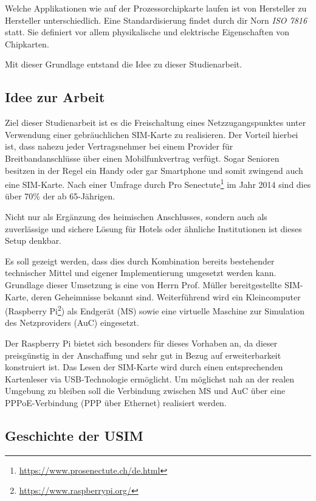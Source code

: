 Welche Applikationen wie auf der Prozessorchipkarte laufen ist von Hersteller zu Hersteller unterschiedlich.
Eine Standardisierung findet durch dir Norn \textit{ISO 7816} statt. Sie definiert vor allem physikalische
und elektrische Eigenschaften von Chipkarten.

Mit dieser Grundlage entstand die Idee zu dieser Studienarbeit.

\subsection{Idee zur Arbeit}
\label{idee-arbeit}
Ziel dieser Studienarbeit ist es die Freischaltung eines Netzzugangspunktes unter Verwendung einer 
gebräuchlichen \ac{SIM}-Karte zu realisieren. Der Vorteil hierbei ist, dass nahezu jeder
Vertragsnehmer bei einem Provider für Breitbandanschlüsse über einen Mobilfunkvertrag verfügt.
Sogar Senioren besitzen in der Regel ein Handy oder gar Smartphone und somit zwingend auch eine
\ac{SIM}-Karte. Nach einer Umfrage durch Pro Senectute\footnote{\url{https://www.prosenectute.ch/de.html}}
im Jahr 2014 sind dies über 70\% der ab 65-Jährigen.

Nicht nur als Ergänzung des heimischen Anschlusses, sondern auch als zuverlässige und sichere Lösung
für Hotels oder ähnliche Institutionen ist dieses Setup denkbar.

Es soll gezeigt werden, dass dies durch Kombination bereits bestehender technischer Mittel und
eigener Implementierung umgesetzt werden kann. Grundlage dieser Umsetzung is eine von Herrn Prof. Müller
bereitgestellte \ac{SIM}-Karte, deren Geheimnisse bekannt sind. Weiterführend wird ein Kleincomputer
(Raspberry Pi\footnote{\url{https://www.raspberrypi.org/}}) als Endgerät (\ac{MS}) sowie eine virtuelle
Maschine zur Simulation des Netzproviders (\ac{AuC}) eingesetzt. 

Der Raspberry Pi bietet sich besonders für dieses Vorhaben an, da dieser preisgünstig in der Anschaffung
und sehr gut in Bezug auf erweiterbarkeit konstruiert ist. Das Lesen der \ac{SIM}-Karte
wird durch einen entsprechenden Kartenleser via USB-Technologie ermöglicht. Um möglichst nah
an der realen Umgebung zu bleiben soll die Verbindung zwischen \ac{MS} und \ac{AuC} über eine
\ac{PPPoE}-Verbindung (\ac{PPP} über Ethernet) realisiert werden.

\subsection{Geschichte der USIM}
\label{geschichte-usim}
\clearpage